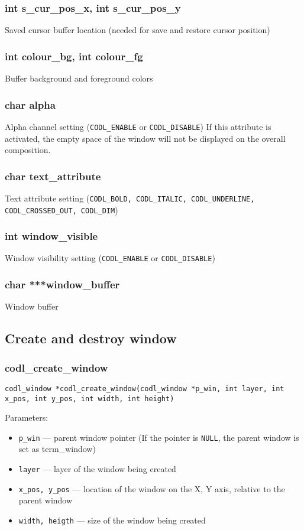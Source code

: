 \documentclass{article}
\begin{document}
\subsubsection*{int s\_cur\_pos\_x, int s\_cur\_pos\_y}
Saved cursor buffer location (needed for save and restore cursor position)

\subsubsection*{int colour\_bg, int colour\_fg}
Buffer background and foreground colors

\subsubsection*{char alpha}
Alpha channel setting ({\tt CODL\_ENABLE} or {\tt CODL\_DISABLE})
If this attribute is activated, the empty space of the window will
not be displayed on the overall composition.

\subsubsection*{char text\_attribute}
Text attribute setting ({\tt CODL\_BOLD, CODL\_ITALIC, CODL\_UNDERLINE,
CODL\_CROSSED\_OUT, CODL\_DIM})

\subsubsection*{int window\_visible}
Window visibility setting ({\tt CODL\_ENABLE} or {\tt CODL\_DISABLE})

\subsubsection*{char ***window\_buffer}
Window buffer

\subsection{Create and destroy window}

\subsubsection{codl\_create\_window}
{\tt codl\_window *codl\_create\_window(codl\_window *p\_win, int layer, int x\_pos, int y\_pos, int width, int height)}

\medskip Parameters:
\begin{itemize}
\item{{\tt *p\_win} --- parent window pointer (If the pointer is {\tt NULL}, the parent window is set as term\_window)}
\item{{\tt layer} --- layer of the window being created}
\item{{\tt x\_pos, y\_pos} --- location of the window on the X, Y axis, relative to the parent window}
\item{{\tt width, heigth} --- size of the window being created}
\end{itemize}
\end{document}
